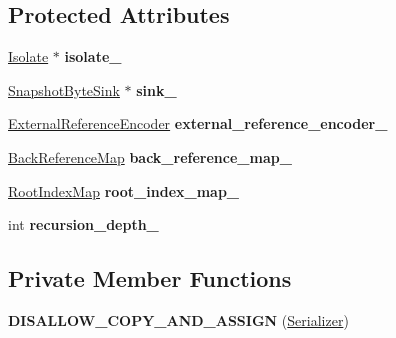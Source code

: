 \subsection*{Protected Attributes}
\begin{DoxyCompactItemize}
\item 
\hyperlink{classv8_1_1internal_1_1_isolate}{Isolate} $\ast$ {\bfseries isolate\+\_\+}\hypertarget{classv8_1_1internal_1_1_serializer_a2a0bb475a79a6094294882195dd6cb86}{}\label{classv8_1_1internal_1_1_serializer_a2a0bb475a79a6094294882195dd6cb86}

\item 
\hyperlink{classv8_1_1internal_1_1_snapshot_byte_sink}{Snapshot\+Byte\+Sink} $\ast$ {\bfseries sink\+\_\+}\hypertarget{classv8_1_1internal_1_1_serializer_a58e895e50aa57b424f78777c8be962c0}{}\label{classv8_1_1internal_1_1_serializer_a58e895e50aa57b424f78777c8be962c0}

\item 
\hyperlink{classv8_1_1internal_1_1_external_reference_encoder}{External\+Reference\+Encoder} {\bfseries external\+\_\+reference\+\_\+encoder\+\_\+}\hypertarget{classv8_1_1internal_1_1_serializer_a77ce43f8a7fe3b7dfb19208665eb5d14}{}\label{classv8_1_1internal_1_1_serializer_a77ce43f8a7fe3b7dfb19208665eb5d14}

\item 
\hyperlink{classv8_1_1internal_1_1_back_reference_map}{Back\+Reference\+Map} {\bfseries back\+\_\+reference\+\_\+map\+\_\+}\hypertarget{classv8_1_1internal_1_1_serializer_acd6ddb93446545718c421b9a0d6fe563}{}\label{classv8_1_1internal_1_1_serializer_acd6ddb93446545718c421b9a0d6fe563}

\item 
\hyperlink{classv8_1_1internal_1_1_root_index_map}{Root\+Index\+Map} {\bfseries root\+\_\+index\+\_\+map\+\_\+}\hypertarget{classv8_1_1internal_1_1_serializer_a4256760da33786e0706d86823f10aaeb}{}\label{classv8_1_1internal_1_1_serializer_a4256760da33786e0706d86823f10aaeb}

\item 
int {\bfseries recursion\+\_\+depth\+\_\+}\hypertarget{classv8_1_1internal_1_1_serializer_af22b7761fa592a50cba1d5b002fa351d}{}\label{classv8_1_1internal_1_1_serializer_af22b7761fa592a50cba1d5b002fa351d}

\end{DoxyCompactItemize}
\subsection*{Private Member Functions}
\begin{DoxyCompactItemize}
\item 
{\bfseries D\+I\+S\+A\+L\+L\+O\+W\+\_\+\+C\+O\+P\+Y\+\_\+\+A\+N\+D\+\_\+\+A\+S\+S\+I\+GN} (\hyperlink{classv8_1_1internal_1_1_serializer}{Serializer})\hypertarget{classv8_1_1internal_1_1_serializer_ac1f373e7635d2c88507803f55d67b554}{}\label{classv8_1_1internal_1_1_serializer_ac1f373e7635d2c88507803f55d67b554}

\end{DoxyCompactItemize}
